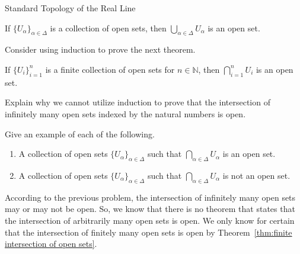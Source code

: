 \begin{section}{Standard Topology of the Real Line}
\begin{theorem}\label{thm:union of open sets}
If $\{U_{\alpha}\}_{\alpha\in\Delta}$ is a collection of open sets, then $\bigcup_{\alpha\in\Delta} U_{\alpha}$ is an open set.
\end{theorem}

Consider using induction to prove the next theorem.

\begin{theorem}\label{thm:finite intersection of open sets}
If $\{U_{i}\}_{i=1}^n$ is a finite collection of open sets for $n\in \mathbb{N}$, then $\bigcap_{i=1}^n U_{i}$ is an open set.
\end{theorem}

\begin{problem}
Explain why we cannot utilize induction to prove that the intersection of infinitely many open sets indexed by the natural numbers is open.
\end{problem}

\begin{problem}\label{prob:intersection of open sets}
Give an example of each of the following.
\begin{enumerate}[label=\textrm{(\alph*)}]
\item A collection of open sets $\{U_{\alpha}\}_{\alpha\in\Delta}$ such that $\bigcap_{\alpha\in\Delta} U_{\alpha}$ is an open set.
\item A collection of open sets $\{U_{\alpha}\}_{\alpha\in\Delta}$ such that $\bigcap_{\alpha\in\Delta} U_{\alpha}$ is not an open set.
\end{enumerate}
\end{problem}

According to the previous problem, the intersection of infinitely many open sets may or may not be open. So, we know that there is no theorem that states that the intersection of arbitrarily many open sets is open. We only know for certain that the intersection of finitely many open sets is open by Theorem~\ref{thm:finite intersection of open sets}.



\end{section}
